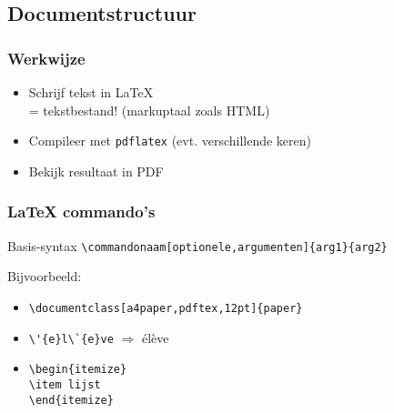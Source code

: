 \documentclass[aspectratio=169]{beamer}
\begin{document}
\subsection{Documentstructuur}

\begin{frame}
  \frametitle{Werkwijze}
  
  \begin{itemize}
    \item<+-> Schrijf tekst in {\LaTeX}\\
    = tekstbestand! (markuptaal zoals HTML)
    \item<+-> Compileer met \texttt{pdflatex} (evt. verschillende keren)
    \item<+-> Bekijk resultaat in PDF
  \end{itemize}
\end{frame}

\begin{frame}[fragile]
  \frametitle{{\LaTeX} commando's}
  
  \begin{block}{Basis-syntax}
    \verb|\commandonaam[optionele,argumenten]{arg1}{arg2}|
  \end{block}
  
  \pause
  
  Bijvoorbeeld:
  
  \begin{itemize}
    \item<+-> \verb|\documentclass[a4paper,pdftex,12pt]{paper}|
    \item<+-> \verb|\'{e}l\`{e}ve| $\Rightarrow$ \'el\`eve
    \item<+-> \verb|\begin{itemize}|\\
    \verb|\item lijst|\\
    \verb|\end{itemize}|
  \end{itemize}
  
\end{frame}
\end{document}
